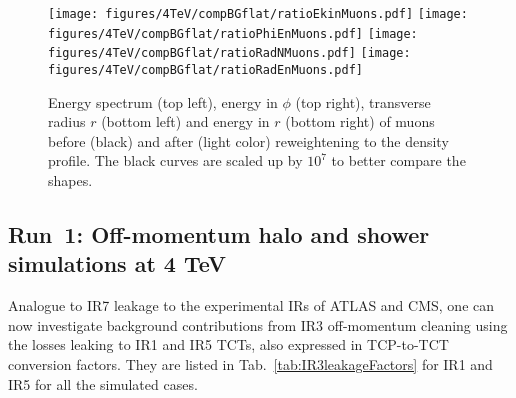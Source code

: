 \begin{figure}
\begin{center}
  \texttt{[image: figures/4TeV/compBGflat/ratioEkinMuons.pdf]}
  \texttt{[image: figures/4TeV/compBGflat/ratioPhiEnMuons.pdf]}
  \texttt{[image: figures/4TeV/compBGflat/ratioRadNMuons.pdf]}
  \texttt{[image: figures/4TeV/compBGflat/ratioRadEnMuons.pdf]}
\end{center}
\vspace{-0.6cm}
 \caption{Energy spectrum (top left), energy in $\phi$ (top right), transverse radius $r$ (bottom left) and energy in $r$ (bottom right) of muons before (black) and after (light color) reweightening to the density profile. The black curves are scaled up by $10^7$ to better compare the shapes. %
  \label{fig:cv81EkinPhiEn4TeV}} 
\end{figure}

\clearpage
\newpage
\subsection{Run~1: Off-momentum halo and shower simulations at 4 TeV}

Analogue to IR7 leakage to the experimental IRs of ATLAS and CMS, one can now investigate background contributions from IR3 off-momentum cleaning using the losses leaking to IR1 and IR5 TCTs, also expressed in TCP-to-TCT conversion factors. They are listed in Tab.~\ref{tab:IR3leakageFactors} for IR1 and IR5 for all the simulated cases.

